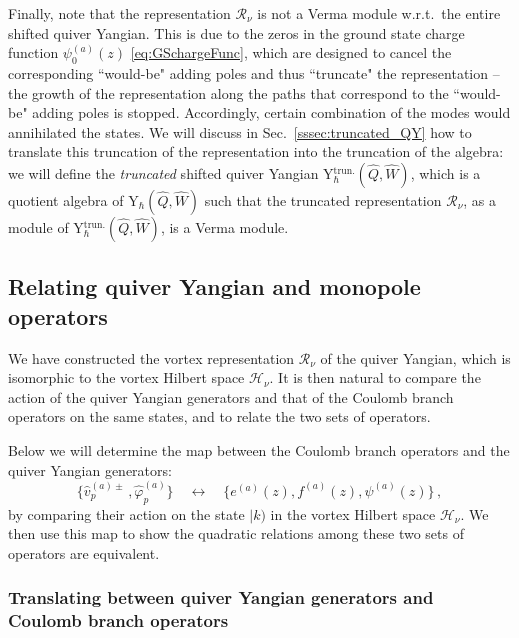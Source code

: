 \documentclass[12pt,a4paper]{article}
\renewcommand{\(}{\left(}
\renewcommand{\)}{\right)}
\renewcommand{\(}{\left(}
\renewcommand{\)}{\right)}
\begin{document}
\medskip

Finally, note that the representation $\mathcal{R}_\nu$ is not a Verma module w.r.t.\ the entire shifted quiver Yangian. 
This is due to the zeros in the ground state charge function $\psi^{(a)}_0(z)$ \eqref{eq:GSchargeFunc}, which are designed to cancel the corresponding ``would-be" adding poles and thus ``truncate" the representation -- the growth of the representation along the paths that correspond to the ``would-be" adding poles is stopped. 
Accordingly, certain combination of the modes would annihilated the states. 
We will discuss in Sec.~\ref{sssec:truncated_QY} how to translate this truncation of the representation into the truncation of the algebra:  we will define the \textit{truncated} shifted quiver Yangian Y$^{\text{trun.}}_{\hbar}(\widehat{Q},\widehat{W})$, which is a quotient algebra of Y$_{\hbar}(\widehat{Q},\widehat{W})$ such that the truncated representation $\mathcal{R}_\nu$, as a module of Y$^{\text{trun.}}_{\hbar}(\widehat{Q},\widehat{W})$, is a Verma module.


    
\subsection{Relating quiver Yangian and monopole operators}\label{ssec:relate_QY_and_monopole}

We have constructed the vortex representation $\mathcal{R}_\nu$ of the quiver Yangian, which is isomorphic to the vortex Hilbert space $\mathcal{H}_\nu$. 
It is then natural to compare the action of the quiver Yangian generators and that of the Coulomb branch operators on the same states, and to relate the two sets of operators.

Below we will determine the map between the Coulomb branch operators and the quiver Yangian generators:
\begin{equation}
\{\hat{v}^{(a)\pm}_{p}\,, \hat{\varphi}^{(a)}_{p}  \} 
\quad \longleftrightarrow \quad
\{e^{(a)}(z),f^{(a)}(z),\psi^{(a)}(z)\}\,,
\end{equation}   
by comparing their action on the state $|k)$ in the vortex Hilbert space $\mathcal{H}_{\nu}$.
We then use this map to show the quadratic relations among these two sets of operators are equivalent.  


\subsubsection{Translating between quiver Yangian generators and Coulomb branch operators}\label{sssec:translation_between_QY_monopole}
\end{document}
